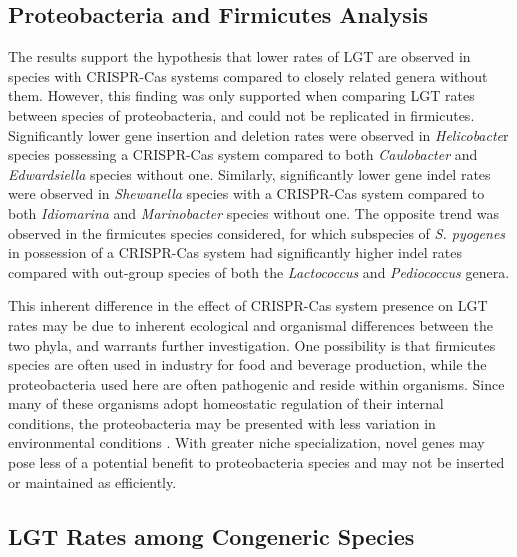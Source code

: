 \documentclass[english]{article}
\begin{document}
\subsection{Proteobacteria and Firmicutes Analysis}

The results support the hypothesis that lower rates of LGT are
observed in species with CRISPR-Cas systems compared to closely
related genera without them. However, this finding was only supported
when comparing LGT rates between species of proteobacteria, and could
not be replicated in firmicutes. Significantly lower gene insertion
and deletion rates were
observed in \textit{Helicobacte}r species possessing a CRISPR-Cas system
compared to both \textit{Caulobacter} and \textit{Edwardsiella} species 
without one.
Similarly, significantly lower gene indel rates were observed in
\textit{Shewanella}
species with a CRISPR-Cas system compared to both \textit{Idiomarina} and
\textit{Marinobacter} species without one. 
The opposite trend was observed in
the firmicutes species considered, for which subspecies of 
\textit{S. pyogenes} in
possession of a CRISPR-Cas system had significantly higher indel rates
compared with out-group species of both the \textit{Lactococcus} and
\textit{Pediococcus} genera. 

This inherent difference in the effect of CRISPR-Cas system presence on LGT
rates may be due to inherent ecological and organismal differences
between the two phyla, and warrants further investigation. One
possibility is that firmicutes species are often used in industry for
food and beverage production, while the proteobacteria used here are often
pathogenic and reside within organisms. Since many of these 
organisms adopt homeostatic regulation of their internal conditions,
the proteobacteria may be presented with less variation in
environmental conditions \citep{Suer:07}. With greater niche 
specialization, novel
genes may pose less of a potential benefit to proteobacteria species 
and may not
be inserted or maintained as efficiently.  

\subsection{LGT Rates among Congeneric Species}
\end{document}
